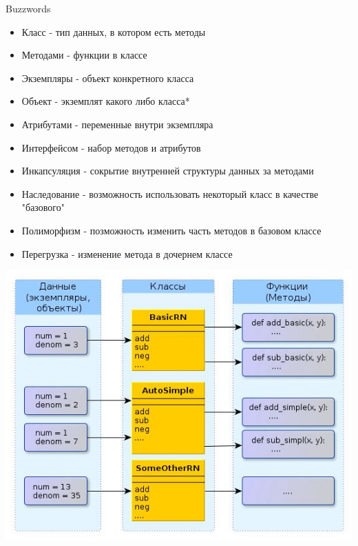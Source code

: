\documentclass{article}
\begin{document}
\begin{center} Buzzwords \end{center}
\begin{itemize}
    \item Класс - тип данных, в котором есть методы
    \item Методами - функции в классе
    \item Экземпляры - объект конкретного класса
    \item Объект - экземплят какого либо класса*
    \item Атрибутами  - переменные внутри экземпляра
    \item Интерфейсом - набор методов и атрибутов
    \item Инкапсуляция - сокрытие внутренней структуры данных за методами
    \item Наследование - возможность использовать некоторый класс в качестве "базового"
    \item Полиморфизм - позможность изменить часть методов в базовом классе
    \item Перегрузка - изменение метода в дочернем классе
\end{itemize}
\newpage

\begin{center} \includegraphics[scale=0.8]{images/oop_style.jpg} \end{center} 
\newpage
\end{document}
